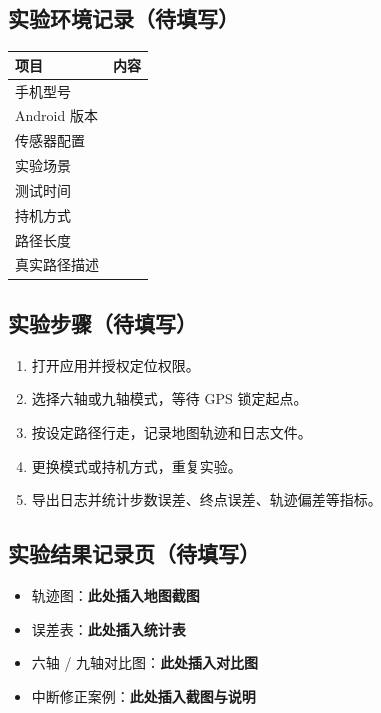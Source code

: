 \documentclass[12pt,a4paper]{ctexart}
\begin{document}
\subsection{实验环境记录（待填写）}
\begin{longtable}{p{}p{}}
\toprule
项目 & 内容 \\
\midrule
\endhead
手机型号 & \\
Android 版本 & \\
传感器配置 & \\
实验场景 & \\
测试时间 & \\
持机方式 & \\
路径长度 & \\
真实路径描述 & \\
\bottomrule
\end{longtable}

\subsection{实验步骤（待填写）}
\begin{enumerate}
    \item 打开应用并授权定位权限。
    \item 选择六轴或九轴模式，等待 GPS 锁定起点。
    \item 按设定路径行走，记录地图轨迹和日志文件。
    \item 更换模式或持机方式，重复实验。
    \item 导出日志并统计步数误差、终点误差、轨迹偏差等指标。
\end{enumerate}

\subsection{实验结果记录页（待填写）}
\begin{itemize}
    \item 轨迹图：\textbf{此处插入地图截图}
    \item 误差表：\textbf{此处插入统计表}
    \item 六轴 / 九轴对比图：\textbf{此处插入对比图}
    \item 中断修正案例：\textbf{此处插入截图与说明}
\end{itemize}

\vspace{3cm}
\begin{center}
\end{center}
\end{document}
